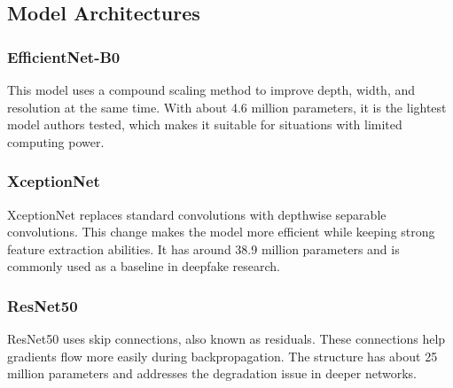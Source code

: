 \documentclass[conference]{IEEEtran}
\begin{document}
\subsection{Model Architectures}

\subsubsection{EfficientNet-B0}
This model uses a compound scaling method to improve depth, width, and resolution at the same time. With about 4.6 million parameters, it is the lightest model authors tested, which makes it suitable for situations with limited computing power.

\subsubsection{XceptionNet}
XceptionNet replaces standard convolutions with depthwise separable convolutions. This change makes the model more efficient while keeping strong feature extraction abilities. It has around 38.9 million parameters and is commonly used as a baseline in deepfake research.

\subsubsection{ResNet50}
ResNet50 uses skip connections, also known as residuals. These connections help gradients flow more easily during backpropagation. The structure has about 25 million parameters and addresses the degradation issue in deeper networks.
\end{document}
